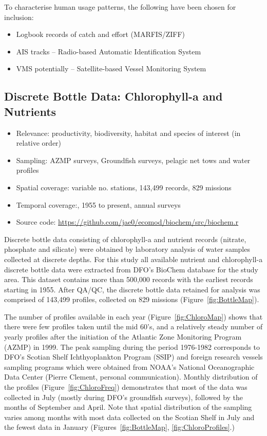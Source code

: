 \documentclass[letterpaper,portrait,11pt]{scrartcl}
\numberwithin{equation}{section}		%
\numberwithin{figure}{section}		%
\numberwithin{table}{section}				%
\begin{document}
To characterise human usage patterns, the following have been chosen for inclusion:

\begin{itemize}
	\item Logbook records of catch and effort (MARFIS/ZIFF)
  \item AIS tracks -- Radio-based Automatic Identification System
  \item VMS potentially -- Satellite-based Vessel Monitoring System
\end{itemize}

\subsection{Discrete Bottle Data: Chlorophyll-a and Nutrients}

\begin{itemize}
  \item Relevance: productivity, biodiversity, habitat and species of interest (in relative order)
  \item Sampling: AZMP surveys, Groundfish surveys, pelagic net tows and water profiles
  \item Spatial coverage: variable no. stations, 143,499 records, 829 missions
  \item Temporal coverage:,  1955 to present, annual surveys
  \item Source code: \url{https://github.com/jae0/ecomod/biochem/src/biochem.r}
\end{itemize}

Discrete bottle data consisting of chlorophyll-a and nutrient records (nitrate, phosphate and silicate) were obtained by laboratory analysis of water samples collected at discrete depths. For this study all available nutrient and chlorophyll-a discrete bottle data were extracted from DFO's BioChem database for the study area. This dataset contains more than 500,000 records with the earliest records starting in 1955. After QA/QC, the discrete bottle data retained for analysis was comprised of 143,499 profiles, collected on 829 missions (Figure~\ref{fig:BottleMap}).

The number of profiles available in each year (Figure~\ref{fig:ChloroMap}) shows that there were few profiles taken until the mid 60's, and a relatively steady number of yearly profiles after the initiation of the Atlantic Zone Monitoring Program (AZMP) in 1999. The peak sampling during the period 1976-1982 corresponds to DFO's Scotian Shelf Ichthyoplankton Program (SSIP) and foreign research vessels sampling programs which were obtained from NOAA's National Oceanographic Data Center (Pierre Clement, personal communication).  Monthly distribution of the profiles (Figure~\ref{fig:ChloroFreq})  demonstrates that most of the data was collected in July (mostly during DFO's groundfish surveys), followed by the months of September and April. Note that spatial distribution of the sampling varies among months with most data collected on the Scotian Shelf in July and the fewest data in January (Figures~\ref{fig:BottleMap}, \ref{fig:ChloroProfiles}.)
\end{document}
